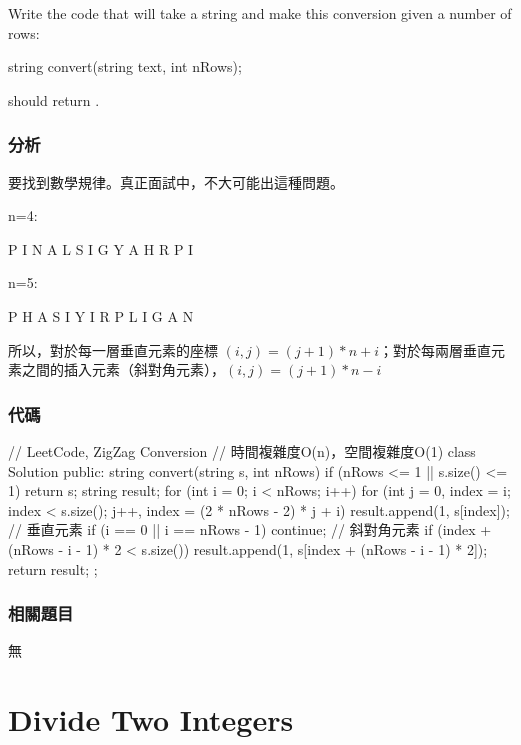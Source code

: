 Write the code that will take a string and make this conversion given a number of rows:
\begin{Code}
string convert(string text, int nRows);
\end{Code}
 should return .


\subsubsection{分析}
要找到數學規律。真正面試中，不大可能出這種問題。

n=4:
\begin{Code}
P     I     N
A   L S   I G
Y A   H R
P     I
\end{Code}

n=5:
\begin{Code}
P       H
A     S I
Y   I   R
P L     I  G
A       N
\end{Code}

所以，對於每一層垂直元素的座標 $(i,j)= (j+1 )*n +i$；對於每兩層垂直元素之間的插入元素（斜對角元素），$(i,j)= (j+1)*n -i$


\subsubsection{代碼}
\begin{Code}
// LeetCode, ZigZag Conversion
// 時間複雜度O(n)，空間複雜度O(1)
class Solution {
public:
    string convert(string s, int nRows) {
        if (nRows <= 1 || s.size() <= 1) return s;
        string result;
        for (int i = 0; i < nRows; i++) {
            for (int j = 0, index = i; index < s.size();
                    j++, index = (2 * nRows - 2) * j + i) {
                result.append(1, s[index]);  // 垂直元素
                if (i == 0 || i == nRows - 1) continue;   // 斜對角元素
                if (index + (nRows - i - 1) * 2 < s.size())
                    result.append(1, s[index + (nRows - i - 1) * 2]);
            }
        }
        return result;
    }
};
\end{Code}


\subsubsection{相關題目}
\begindot
\item 無
\myenddot


\section{Divide Two Integers} %
\label{sec:divide-two-integers}


